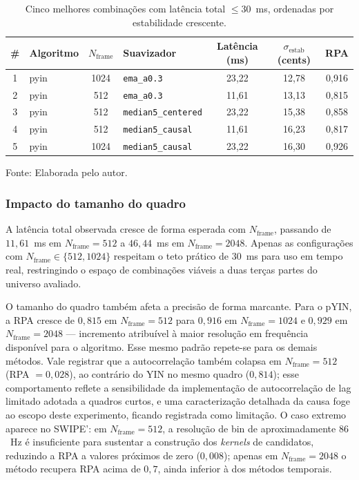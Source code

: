   \begin{table}[H]
  \centering
  \caption{\label{tab:realtime_top5}Cinco melhores combinações com latência total $\leq 30$~ms, ordenadas por estabilidade crescente.}
  \small
  \begin{tabular}{|c|l|c|l|c|c|c|}
  \hline
  \textbf{\#} & \textbf{Algoritmo} & \textbf{$N_{\text{frame}}$} & \textbf{Suavizador} &
  \textbf{Latência (ms)} & \textbf{$\sigma_{\text{estab}}$ (cents)} & \textbf{RPA} \\
  \hline
  1 & pyin & 1024 & \texttt{ema\_a0.3}          & 23{,}22 & 12{,}78 & 0{,}916 \\
  \hline
  2 & pyin & 512  & \texttt{ema\_a0.3}          & 11{,}61 & 13{,}13 & 0{,}815 \\
  \hline
  3 & pyin & 512  & \texttt{median5\_centered}  & 23{,}22 & 15{,}38 & 0{,}858 \\
  \hline
  4 & pyin & 512  & \texttt{median5\_causal}    & 11{,}61 & 16{,}23 & 0{,}817 \\
  \hline
  5 & pyin & 1024 & \texttt{median5\_causal}    & 23{,}22 & 16{,}30 & 0{,}926 \\
  \hline
  \end{tabular}
  \small Fonte: Elaborada pelo autor.
\end{table}

  \subsubsection{Impacto do tamanho do quadro}

  A latência total observada cresce de forma esperada com $N_{\text{frame}}$,
  passando de $11{,}61$~ms em $N_{\text{frame}} = 512$ a $46{,}44$~ms em
  $N_{\text{frame}} = 2048$. Apenas as configurações com $N_{\text{frame}} \in
  \{512, 1024\}$ respeitam o teto prático de 30~ms para uso em tempo real,
  restringindo o espaço de combinações viáveis a duas terças partes do
  universo avaliado.

  O tamanho do quadro também afeta a precisão de forma marcante. Para o pYIN, a
  RPA cresce de $0{,}815$ em $N_{\text{frame}} = 512$ para $0{,}916$ em
  $N_{\text{frame}} = 1024$ e $0{,}929$ em $N_{\text{frame}} = 2048$ —
  incremento atribuível à maior resolução em frequência disponível para o
  algoritmo. Esse mesmo padrão repete-se para os demais métodos. Vale
  registrar que a autocorrelação também colapsa em $N_{\text{frame}} = 512$
  (RPA $= 0{,}028$), ao contrário do YIN no mesmo quadro ($0{,}814$); esse
  comportamento reflete a sensibilidade da implementação de autocorrelação de
  lag limitado adotada a quadros curtos, e uma caracterização detalhada da
  causa foge ao escopo deste experimento, ficando registrada como limitação. O
  caso extremo aparece no SWIPE': em $N_{\text{frame}} = 512$, a resolução de bin
  de aproximadamente $86$~Hz é insuficiente para sustentar a construção dos
  \textit{kernels} de candidatos, reduzindo a RPA a valores próximos de zero
  ($0{,}008$); apenas em $N_{\text{frame}} = 2048$ o método recupera RPA
  acima de $0{,}7$, ainda inferior à dos métodos temporais.

